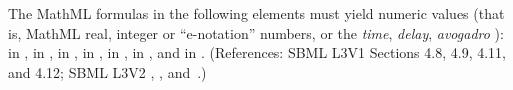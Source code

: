 The MathML formulas in the following elements must yield numeric
values (that is, MathML real, integer or ``e-notation'' numbers,
or the \emph{time}, \emph{delay}, \emph{avogadro} ):
 in \KineticLaw,  in
\InitialAssignment,  in \AssignmentRule,  in
\RateRule,  in \AlgebraicRule,  in \Event
\Delay, and  in \EventAssignment.  (References: SBML L3V1 Sections 4.8, 4.9, 4.11, and 4.12; SBML L3V2 
, , 
 and~.)


